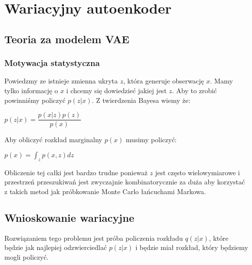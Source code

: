 \documentclass[a4paper,12pt]{book} %
\begin{document}
\chapter{Wariacyjny autoenkoder}
\section{Teoria za modelem VAE}
\subsection{Motywacja statystyczna}
Powiedzmy ze istnieje zmienna ukryta $z$, która generuje obserwację $x$. Mamy tylko informację o $x$ i chcemy się dowiedzieć jakiej jest $z$. Aby to zrobić powinniśmy policzyć $p(z|x)$. Z twierdzenia Bayesa wiemy że:\\
\begin{center}
	$p(z|x)=\dfrac{p(x|z)p(z)}{p(x)}$
\end{center}
Aby obliczyć rozkład marginalny $p(x)$ musimy policzyć:
\begin{center}
	$p(x) = \displaystyle\int_{z}^{}p(x,z)dz$
\end{center}
Obliczenie tej całki jest bardzo trudne ponieważ $z$ jest często wielowymiarowe i przestrzeń przeszukiwań jest zwyczajnie kombinatorycznie za duża aby korzystać z takich metod jak próbkowanie Monte Carlo łańcuchami Markowa. \\

\section{Wnioskowanie wariacyjne}
Rozwiązaniem tego problemu jest próba policzenia rozkładu $q(z|x)$, które będzie jak najlepiej odzwierciedlać $p(z|x)$ i będzie miał rozkład, który będziemy mogli policzyć. 
\end{document}
